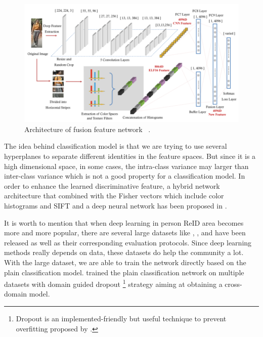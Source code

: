 \begin{figure}
    \includegraphics[width=\linewidth]{figures/ffn.png}
    \caption{
        Architecture of fusion feature network 
        ~\protect\cite{feature-fusion-net-2016}.
    }
    \label{fig:ffn}
\end{figure}

The idea behind classification model is that we are trying to use several 
hyperplanes to separate different identities in the feature spaces. But since 
it is a high dimensional space, in some cases, the intra-class variance may 
larger than inter-class variance which is not a good property for a 
classification model.
In order to enhance the learned discriminative feature,
a hybrid network architecture that combined 
with the Fisher vectors which include color histograms and SIFT and a deep 
neural network has been proposed in \cite{hybrid-net-lda-2016}.

It is worth to mention that when deep learning in person ReID area becomes more 
and more popular, there are several large datasets like
\cite{dataset-cuhk03-2014}, \cite{dataset-market1501-2015}, 
\cite{dataset-dukemtmc-2016} and \cite{dataset-cuhk03-np-2017} have been 
released as well as their corresponding evaluation protocols.
Since deep learning methods really depends on data, these datasets do help the 
community a lot. With the large dataset, we are able to train the 
network directly based on the plain classification model. 
\cite{generic-deep-feature-for-reid-2016} trained the plain classification
network on multiple datasets with domain guided dropout \footnote{Dropout is an 
implemented-friendly but useful technique  to prevent overfitting proposed
by \cite{dropout-paper-2014}.} strategy aiming at 
obtaining a cross-domain model. 

